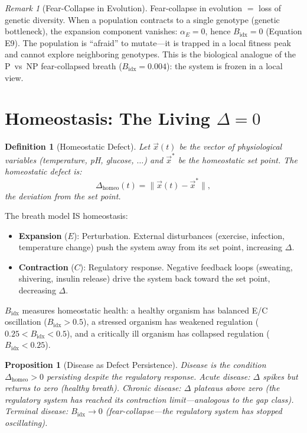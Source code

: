 \documentclass[12pt, openany]{book}
\newtheorem{proposition}[theorem]{Proposition}
\newtheorem{definition}[theorem]{Definition}
\theoremstyle{remark}
\newtheorem{remark}[theorem]{Remark}
\begin{document}
\begin{remark}[Fear-Collapse in Evolution]
Fear-collapse in evolution $=$ loss of genetic diversity.  When a population
contracts to a single genotype (genetic bottleneck), the expansion component
vanishes: $\alpha_E = 0$, hence $B_{\mathrm{idx}} = 0$ (Equation E9).  The
population is ``afraid'' to mutate---it is trapped in a local fitness peak
and cannot explore neighboring genotypes.  This is the biological analogue
of the P~vs~NP fear-collapsed breath ($B_{\mathrm{idx}} = 0.004$): the system
is frozen in a local view.
\end{remark}


\section{Homeostasis: The Living $\Delta = 0$}
\label{sec:homeostasis}

\begin{definition}[Homeostatic Defect]
\label{def:homeo-defect}
Let $\vec{x}(t)$ be the vector of physiological variables (temperature, pH, glucose,
$\ldots$) and $\vec{x}^*$ be the homeostatic set point.  The homeostatic defect is:
\[
  \Delta_{\mathrm{homeo}}(t) = \|\vec{x}(t) - \vec{x}^*\|,
\]
the deviation from the set point.
\end{definition}

\noindent
The breath model IS homeostasis:
\begin{itemize}
  \item \textbf{Expansion} ($E$): Perturbation.  External disturbances (exercise,
        infection, temperature change) push the system away from its set point,
        increasing $\Delta$.
  \item \textbf{Contraction} ($C$): Regulatory response.  Negative feedback loops
        (sweating, shivering, insulin release) drive the system back toward the
        set point, decreasing $\Delta$.
\end{itemize}

\noindent
$B_{\mathrm{idx}}$ measures homeostatic health: a healthy organism has balanced
E/C oscillation ($B_{\mathrm{idx}} > 0.5$), a stressed organism has weakened
regulation ($0.25 < B_{\mathrm{idx}} < 0.5$), and a critically ill organism has
collapsed regulation ($B_{\mathrm{idx}} < 0.25$).

\begin{proposition}[Disease as Defect Persistence]
\label{prop:disease}
Disease is the condition $\Delta_{\mathrm{homeo}} > 0$ persisting despite the
regulatory response.  Acute disease: $\Delta$ spikes but returns to zero (healthy
breath).  Chronic disease: $\Delta$ plateaus above zero (the regulatory system
has reached its contraction limit---analogous to the gap class).  Terminal disease:
$B_{\mathrm{idx}} \to 0$ (fear-collapse---the regulatory system has stopped
oscillating).
\end{proposition}
\end{document}
